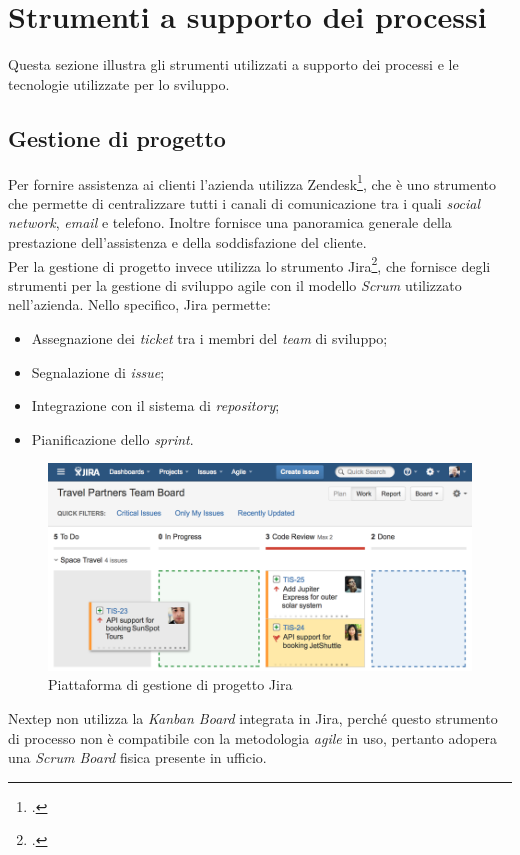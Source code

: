 \section{Strumenti a supporto dei processi}
Questa sezione illustra gli strumenti utilizzati a supporto dei processi e le tecnologie utilizzate per lo sviluppo.
\subsection{Gestione di progetto}
Per fornire assistenza ai clienti l'azienda utilizza Zendesk\footcite{https://www.zendesk.it/}, che è uno strumento che permette di centralizzare tutti i canali di comunicazione tra i quali \emph{social network}, \emph{email} e telefono. Inoltre fornisce una panoramica generale della prestazione dell'assistenza e della soddisfazione del cliente.\\Per la gestione di progetto invece utilizza lo strumento Jira\footcite{https://www.atlassian.com/software/jira}, che fornisce degli strumenti per la gestione di sviluppo agile con il modello \emph{Scrum} utilizzato nell'azienda. Nello specifico, Jira permette:
\begin{itemize}
\item Assegnazione dei \emph{ticket} tra i membri del \emph{team} di sviluppo;
\item Segnalazione di \emph{issue};
\item Integrazione con il sistema di \emph{repository};
\item Pianificazione dello \emph{sprint}.
\end{itemize}
\begin{figure}[h]
\centering
\includegraphics[scale=0.4]{immagini/jira}
\caption{Piattaforma di gestione di progetto Jira}
\label{fig:jira}
\end{figure}
Nextep non utilizza la \emph{Kanban Board} integrata in Jira, perché questo strumento di processo non è compatibile con la metodologia \emph{agile} in uso, pertanto adopera una \emph{Scrum Board} fisica presente in ufficio.
\newpage
